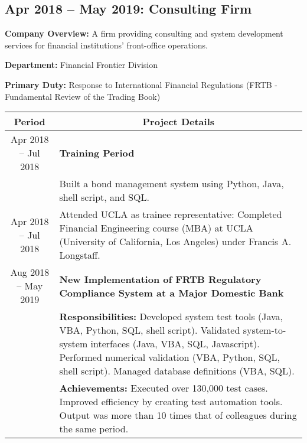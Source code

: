 \documentclass[uplatex,a4j,10.5pt,dvipdfmx]{jsarticle}
\newcommand{\textbfsubsection}[1]{\subsection*{\textbf{#1}}}
\begin{document}
\textbfsubsection{Apr 2018 -- May 2019: Consulting Firm}

\noindent\textbf{Company Overview:} A firm providing consulting and system development services for financial institutions' front-office operations.

\noindent\textbf{Department:} Financial Frontier Division

\noindent\textbf{Primary Duty:} Response to International Financial Regulations (FRTB - Fundamental Review of the Trading Book)

\begin{longtable}{|c|p{14cm}|}
	\hline
	\multicolumn{1}{|c|}{\textbf{Period}} & \multicolumn{1}{c|}{\textbf{Project Details}}                                                                                                                                                                                                                                         \\
	\hline
	\endhead

	\hline
	Apr 2018 -- Jul 2018                  & \textbf{\textbullet{} Training Period}                                                                                                                                                                                                                                                \\
	                                      & Built a bond management system using Python, Java, shell script, and SQL.                                                                                                                                                                                                             \\
	\hline
	Apr 2018 -- Jul 2018                  & Attended UCLA as trainee representative: Completed Financial Engineering course (MBA) at UCLA (University of California, Los Angeles) under Francis A. Longstaff.                                                                                                                     \\
	\hline
	Aug 2018 -- May 2019                  & \textbf{\textbullet{} New Implementation of FRTB Regulatory Compliance System at a Major Domestic Bank}                                                                                                                                                                               \\
	                                      & {\small \textbf{Responsibilities:}} Developed system test tools (Java, VBA, Python, SQL, shell script). Validated system-to-system interfaces (Java, VBA, SQL, Javascript). Performed numerical validation (VBA, Python, SQL, shell script). Managed database definitions (VBA, SQL). \\
	                                      & {\small \textbf{Achievements:}} Executed over 130,000 test cases. Improved efficiency by creating test automation tools. Output was more than 10 times that of colleagues during the same period.                                                                                     \\
	\hline
\end{longtable}
\end{document}
